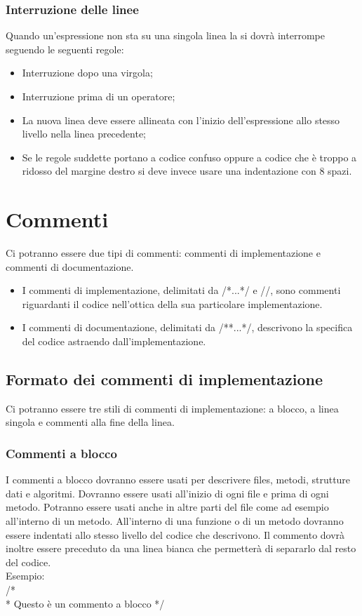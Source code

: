 \documentclass[11pt,titlepage,a4paper]{report}
\begin{document}
\subsection{Interruzione delle linee}
Quando un'espressione non sta su una singola linea la si dovr\`a interrompe seguendo le seguenti regole:
\begin{itemize}
\item Interruzione dopo una virgola;
\item Interruzione prima di un operatore;
\item La nuova linea deve essere allineata con l'inizio dell'espressione allo stesso livello nella linea precedente;
\item Se le regole suddette portano a codice confuso oppure a codice che è troppo a ridosso del margine destro si deve invece usare una indentazione con 8 spazi.
\end{itemize}

\chapter{Commenti}
Ci potranno essere due tipi di commenti: commenti di implementazione e commenti di documentazione. 
\begin{itemize}
\item I commenti di implementazione, delimitati da /*...*/ e //, sono commenti riguardanti il codice nell'ottica della sua particolare implementazione. 
\item I commenti di documentazione, delimitati da /**...*/, descrivono la specifica del codice astraendo dall'implementazione.
\end{itemize}
\section{Formato dei commenti di implementazione}
Ci potranno essere tre stili di commenti di implementazione: a blocco, a linea singola e commenti alla fine della linea.
\subsection{Commenti a blocco}
 I commenti a blocco dovranno essere usati per descrivere files, metodi, strutture dati e algoritmi. Dovranno essere usati all'inizio di ogni file e prima di ogni metodo. Potranno essere usati anche in altre parti del file come ad esempio all'interno di un metodo. All'interno di una funzione o di un metodo dovranno essere indentati allo stesso livello del codice che descrivono. Il commento dovr\`a inoltre essere preceduto da una linea bianca che permetter\`a di separarlo dal resto del codice. \\
Esempio: \\
/* \\
* Questo \`e un commento a blocco \newline
*/ \\
\end{document}

